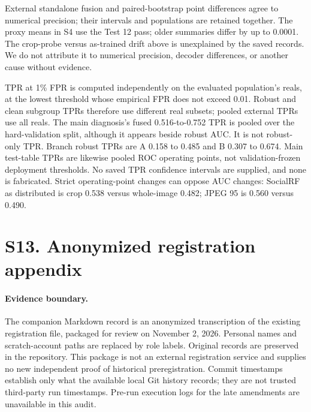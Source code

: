 \documentclass[letterpaper]{article}
\begin{document}
External standalone fusion and paired-bootstrap point differences agree to numerical precision; their intervals and populations are retained together. The proxy means in S4 use the Test 12 pass; older summaries differ by up to 0.0001. The crop-probe versus as-trained drift above is unexplained by the saved records. We do not attribute it to numerical precision, decoder differences, or another cause without evidence.

TPR at 1\% FPR is computed independently on the evaluated population's reals, at the lowest threshold whose empirical FPR does not exceed 0.01. Robust and clean subgroup TPRs therefore use different real subsets; pooled external TPRs use all reals. The main diagnosis's fused 0.516-to-0.752 TPR is pooled over the hard-validation split, although it appears beside robust AUC. It is not robust-only TPR. Branch robust TPRs are A 0.158 to 0.485 and B 0.307 to 0.674. Main test-table TPRs are likewise pooled ROC operating points, not validation-frozen deployment thresholds. No saved TPR confidence intervals are supplied, and none is fabricated. Strict operating-point changes can oppose AUC changes: SocialRF as distributed is crop 0.538 versus whole-image 0.482; JPEG 95 is 0.560 versus 0.490.

\section{S13. Anonymized registration appendix}

\paragraph{Evidence boundary.} The companion Markdown record is an anonymized transcription of the existing registration file, packaged for review on November 2, 2026. Personal names and scratch-account paths are replaced by role labels. Original records are preserved in the repository. This package is not an external registration service and supplies no new independent proof of historical preregistration. Commit timestamps establish only what the available local Git history records; they are not trusted third-party run timestamps. Pre-run execution logs for the late amendments are unavailable in this audit.
\end{document}
